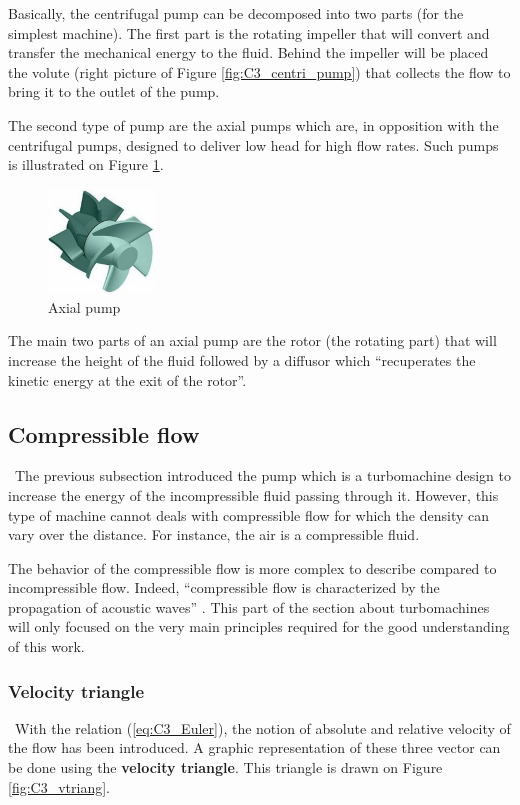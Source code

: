 Basically, the centrifugal pump can be decomposed into two parts (for the simplest machine). The first  part is the rotating impeller that will convert and transfer the mechanical energy to the fluid. Behind the impeller will be placed the volute (right picture of Figure \ref{fig:C3_centri_pump}) that collects the flow to bring it to the outlet of the pump.\newpage

The second type of pump are the axial pumps which are, in opposition with the centrifugal pumps, designed to deliver low head for high flow rates. Such pumps is illustrated on Figure \ref{fig:C3_axial_pump}.
\begin{figure}[h!]
    \centering
    \includegraphics[width=0.25\textwidth]{axial_pump.png}
    \caption{Axial pump \cite{Hillewaert2019}}
    \label{fig:C3_axial_pump}
\end{figure}

The main two parts of an axial pump are the rotor (the rotating part) that will increase the height of the fluid followed by a diffusor which “recuperates the kinetic energy at the exit of the rotor”\cite{Hillewaert2019}.
\subsection{Compressible flow}
\quad\ The previous subsection introduced the pump which is a turbomachine design to increase the energy of the incompressible fluid passing through it. However, this type of machine cannot deals with compressible flow for which the density can vary over the distance. For instance, the air is a compressible fluid.

The behavior of the compressible flow is more complex to describe compared to incompressible flow. Indeed, “compressible flow is characterized by the propagation of acoustic waves” \cite{Hillewaert2019}.   This part of the section about turbomachines will only focused on the very main principles required for the good understanding of this work.


\subsubsection{Velocity triangle}
\quad\ With the relation (\ref{eq:C3_Euler}), the notion of absolute and relative velocity of the flow has been introduced. A graphic representation of these three vector can be done using the \textbf{velocity triangle}. This triangle is drawn on Figure \ref{fig:C3_vtriang}.

